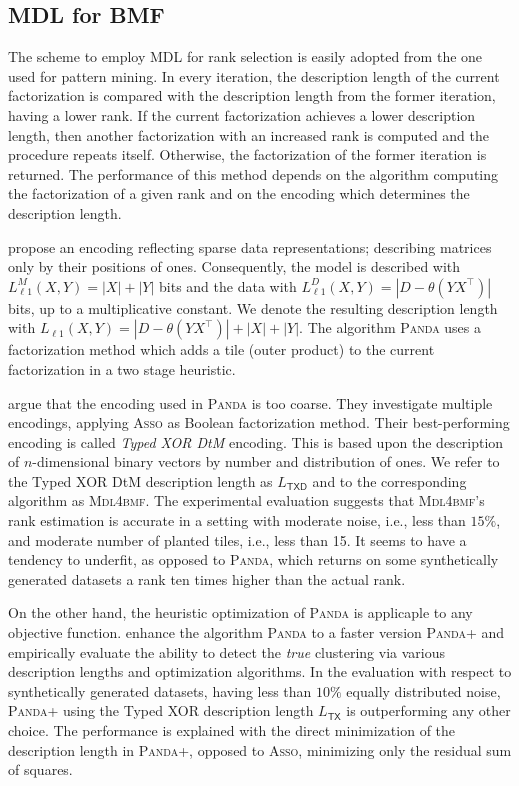 \subsection{MDL for BMF}
The scheme to employ MDL for rank selection is easily adopted from the one used for pattern mining. 
In every iteration, the description length of the current factorization is compared with the description length from the former iteration, having a lower rank. If the current factorization achieves a lower description length, then another factorization with an increased rank is computed and the procedure repeats itself. Otherwise, the factorization of the former iteration is returned. The performance of this method depends on the algorithm computing the factorization of a given rank and on the encoding which determines the description length.

\cite{lucchese2010noise} propose an encoding reflecting sparse data representations; describing matrices only by their positions of ones. Consequently, the model is described with $L^M_{\ell 1}(X,Y)=|X|+|Y|$ bits and the data with $L^D_{\ell 1}(X,Y)=|D-\theta(YX^\top )|$ bits, up to a multiplicative constant. We denote the resulting description length with $L_{\ell 1}(X,Y)=|D-\theta(YX^\top )|+|X|+|Y|$. The algorithm \textsc{Panda} uses a factorization method which adds a tile (outer product) to the current factorization in a two stage heuristic. 
 
\cite{miettinen2014mdl4bmf} argue that the encoding used in \textsc{Panda} is too coarse. They investigate multiple encodings, applying \textsc{Asso} as Boolean factorization method. Their best-performing encoding is called \emph{Typed XOR DtM} encoding. This is based upon the description of $n$-dimensional binary vectors by number and distribution of ones. 
We refer to  the Typed XOR DtM description length as $L_{\mathsf{TXD}}$ and to the corresponding algorithm as \textsc{Mdl4bmf}. The experimental evaluation suggests that \textsc{Mdl4bmf}'s rank estimation is accurate in a setting with moderate noise, i.e., less than $15\%$, and moderate number of planted tiles, i.e., less than 15. It seems to have a tendency to underfit, as opposed to \textsc{Panda}, which returns on some synthetically generated datasets a rank ten times higher than the actual rank.

On the other hand, the heuristic optimization of \textsc{Panda} is applicaple to any objective function. \cite{lucchese2014unifying} enhance the algorithm \textsc{Panda} to a faster version \textsc{Panda+} and empirically evaluate the ability to detect the \emph{true} clustering via various description lengths and optimization algorithms. In the evaluation with respect to synthetically generated datasets, having less than $10\%$ equally distributed noise, \textsc{Panda+} using the Typed XOR description length $L_{\mathsf{TX}}$ is outperforming any other choice. The performance is explained with the direct minimization of the description length in \textsc{Panda+}, opposed to \textsc{Asso}, minimizing only the residual sum of squares.

